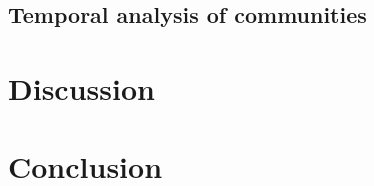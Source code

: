 


\subsection*{Temporal analysis of communities}

 







\section*{Discussion}






\section*{Conclusion}





